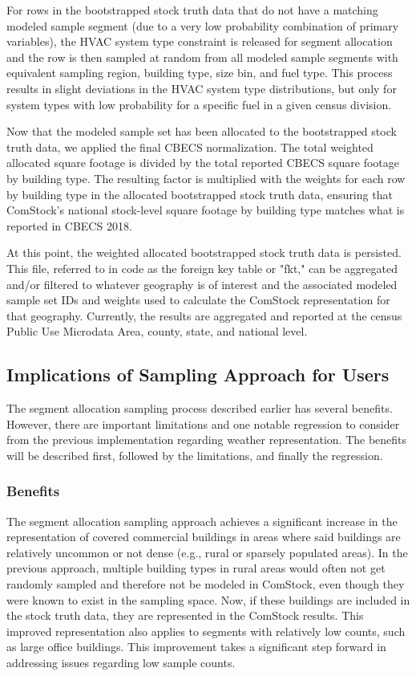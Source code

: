 For rows in the bootstrapped stock truth data that do not have a matching modeled sample segment (due to a very low probability combination of primary variables), the HVAC system type constraint is released for segment allocation and the row is then sampled at random from all modeled sample segments with equivalent sampling region, building type, size bin, and fuel type. This process results in slight deviations in the HVAC system type distributions, but only for system types with low probability for a specific fuel in a given census division.

Now that the modeled sample set has been allocated to the bootstrapped stock truth data, we applied the final CBECS normalization. The total weighted allocated square footage is divided by the total reported CBECS square footage by building type. The resulting factor is multiplied with the weights for each row by building type in the allocated bootstrapped stock truth data, ensuring that ComStock's national stock-level square footage by building type matches what is reported in CBECS 2018.

At this point, the weighted allocated bootstrapped stock truth data is persisted. This file, referred to in code as the foreign key table or "fkt," can be aggregated and/or filtered to whatever geography is of interest and the associated modeled sample set IDs and weights used to calculate the ComStock representation for that geography. Currently, the results are aggregated and reported at the census Public Use Microdata Area, county, state, and national level.

\subsection{Implications of Sampling Approach for Users}
The segment allocation sampling process described earlier has several benefits. However, there are important limitations and one notable regression to consider from the previous implementation regarding weather representation. The benefits will be described first, followed by the limitations, and finally the regression.

\subsubsection{Benefits}
The segment allocation sampling approach achieves a significant increase in the representation of covered commercial buildings in areas where said buildings are relatively uncommon or not dense (e.g., rural or sparsely populated areas). In the previous approach, multiple building types in rural areas would often not get randomly sampled and therefore not be modeled in ComStock, even though they were known to exist in the sampling space. Now, if these buildings are included in the stock truth data, they are represented in the ComStock results. This improved representation also applies to segments with relatively low counts, such as large office buildings. This improvement takes a significant step forward in addressing issues regarding low sample counts.

